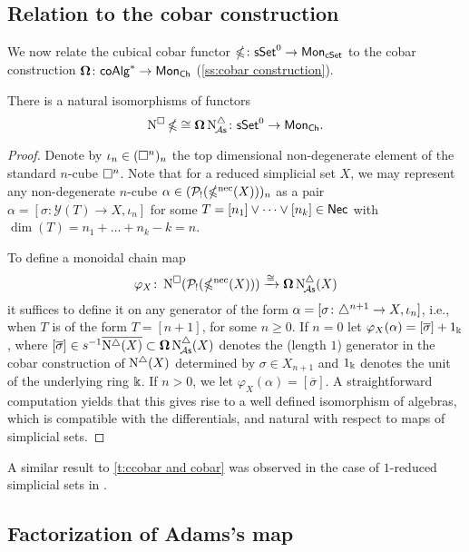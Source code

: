 \subsection{Relation to the cobar construction}

We now relate the cubical cobar functor $\operatorname{\mathbb{\Omega}} \colon \mathsf{sSet}^0 \to \mathsf{Mon}_{\mathsf{cSet}}$ to the cobar construction $\operatorname{\mathbf{\Omega}} \colon \mathsf{coAlg}^\ast \to \mathsf{Mon}_{\mathsf{Ch}}$ (\cref{ss:cobar construction}).

\begin{theorem}\label{t:ccobar and cobar}
	There is a natural isomorphisms of functors
	\[
	\operatorname{N^{\square}} \operatorname{\mathbb{\Omega}} \cong \operatorname{\mathbf{\Omega}} \operatorname{N^{\triangle}_{\!{\mathcal{A}\mathsf{s}}}} \colon \mathsf{sSet}^0 \to \mathsf{Mon}_{\mathsf{Ch}}.
	\]
\end{theorem}

\begin{proof}
	Denote by $\iota_n \in (\square^n)_n$ the top dimensional non-degenerate element of the standard $n$-cube $\square^n$.
	Note that for a reduced simplicial set $X$, we may represent any non-degenerate $n$-cube $\alpha \in (\mathcal{P}_!(\operatorname{\mathbb{\Omega}^{\mathrm{nec}}}(X)))_n$ as a pair $\alpha = [\sigma \colon \mathcal{Y}(T) \to X, \iota_n]$ for some $T = [n_1] \vee \dots \vee [n_k] \in \mathsf{Nec}$ with $\dim(T) = n_1 + \dots + n_k - k = n$.

	To define a monoidal chain map
	\[
	\varphi_X \colon \operatorname{N^{\square}}(\mathcal{P}_!(\operatorname{\mathbb{\Omega}^{\mathrm{nec}}}(X))) \xrightarrow{\cong} \operatorname{\mathbf{\Omega}} \operatorname{N^{\triangle}_{\!{\mathcal{A}\mathsf{s}}}}(X)
	\]
	it suffices to define it on any generator of the form $\alpha=[\sigma \colon \triangle^{n+1} \to X, \iota_{n}]$, i.e., when $T$ is of the form $T = [n+1]$, for some $n \geq 0$.
	If $n = 0$ let $\varphi_X(\alpha)= [\overline{\sigma}] + 1_\Bbbk$, where $[\overline{\sigma}] \in s^{-1} \overline{ \operatorname{N^{\triangle}}(X)} \subset \operatorname{\mathbf{\Omega}} \operatorname{N^{\triangle}_{\!{\mathcal{A}\mathsf{s}}}}(X)$ denotes the (length $1$) generator in the cobar construction of $\operatorname{N^{\triangle}}(X)$ determined by $\sigma \in X_{n+1}$ and $1_\Bbbk$ denotes the unit of the underlying ring $\Bbbk$.
	If $n > 0$, we let $\varphi_X(\alpha)=[\overline{\sigma}]$.
	A straightforward computation yields that this gives rise to a well defined isomorphism of algebras, which is compatible with the differentials, and natural with respect to maps of simplicial sets.
\end{proof}

A similar result to \cref{t:ccobar and cobar} was observed in the case of $1$-reduced simplicial sets in \cite[Section~3.5]{berger1995loops}.

\subsection{Factorization of Adams's map}\label{ss:factorization of adams}

